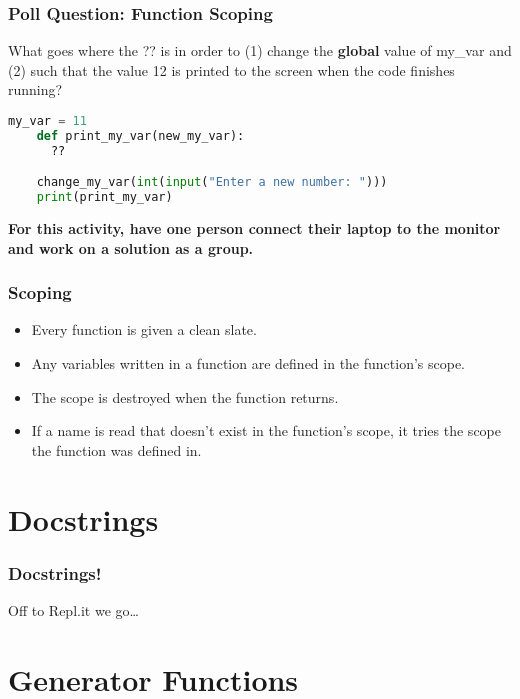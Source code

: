 \documentclass{beamer}
\begin{document}
%
%
%
\begin{frame}[fragile]
  \frametitle{Poll Question: Function Scoping}
  What goes where the ?? is in order to (1) change the \textbf{global} value of my\_var and (2) such that the value 12 is printed to the screen when the code finishes running?
  \begin{lstlisting}[language=Python, autogobble]
    my_var = 11
    def print_my_var(new_my_var):
      ??

    change_my_var(int(input("Enter a new number: ")))
    print(print_my_var)
  \end{lstlisting}
  \vfill
  \textbf{For this activity, have one person connect their laptop to the monitor and work on a solution as a group.}
\end{frame}

%
%
\begin{frame}[fragile]
  \frametitle{Scoping}
  \begin{itemize}
    \item Every function is given a clean slate.
    \item Any variables written in a function are defined in the function's scope.
    \item The scope is destroyed when the function returns.
    \item If a name is read that doesn't exist in the function's scope, it tries the scope the function was defined in.
  \end{itemize}
\end{frame}

\section{Docstrings}
%
%
\begin{frame}[fragile]
  \frametitle{Docstrings!}
  \centering
  Off to Repl.it we go\ldots
\end{frame}

\section{Generator Functions}
\end{document}
